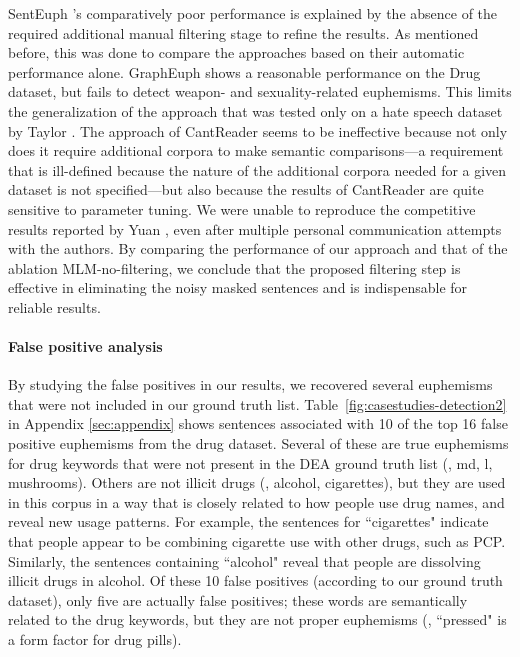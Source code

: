SentEuph \cite{felt2020recognizing}'s comparatively poor performance 
is explained by the absence of the required additional manual filtering stage to refine the results. 
As mentioned before, this was done to compare the approaches based on their automatic performance alone.
GraphEuph \cite{taylor2017surfacing} shows a reasonable performance on the Drug dataset, but fails to detect weapon- and sexuality-related euphemisms. This limits the generalization of the approach that was tested only on a hate speech dataset by Taylor \etal \cite{taylor2017surfacing}. %
The approach of CantReader \cite{yuan2018reading} seems to be ineffective because not only does it require additional corpora to make semantic comparisons---a requirement that is ill-defined because the nature of the additional corpora needed for a given dataset is not specified---but also because the results of CantReader are quite sensitive to parameter tuning. We were unable to reproduce the competitive results reported by Yuan \etal \cite{yuan2018reading}, even after multiple  personal communication attempts with the authors. %
By comparing the performance of our approach and that of the ablation MLM-no-filtering, we conclude that the proposed filtering step is effective in eliminating the noisy masked sentences and is indispensable for reliable results. 



\paragraph{False positive analysis}
By studying the false positives in our results, we recovered several euphemisms that were not included in our ground truth list. 
Table~\ref{fig:casestudies-detection2} in Appendix \ref{sec:appendix} shows sentences associated with 10 of the top 16 false positive euphemisms from the drug dataset. 
Several of these are true euphemisms for drug keywords that were not present in the DEA ground truth list (\eg, md, l, mushrooms).
Others are not illicit drugs (\eg, alcohol, cigarettes), but they are used in this corpus in a way that is closely related to how people use drug names,  and reveal new usage patterns. 
For example, the sentences for ``cigarettes" indicate that people appear to be combining cigarette use with other drugs, such as PCP. 
Similarly, the sentences containing ``alcohol" reveal that people are dissolving illicit drugs in alcohol. 
Of these 10 false positives (according to our ground truth dataset), only five are actually false positives; these words are semantically related to the drug keywords, but they are not proper euphemisms (\eg, ``pressed" is a form factor for drug pills). 



